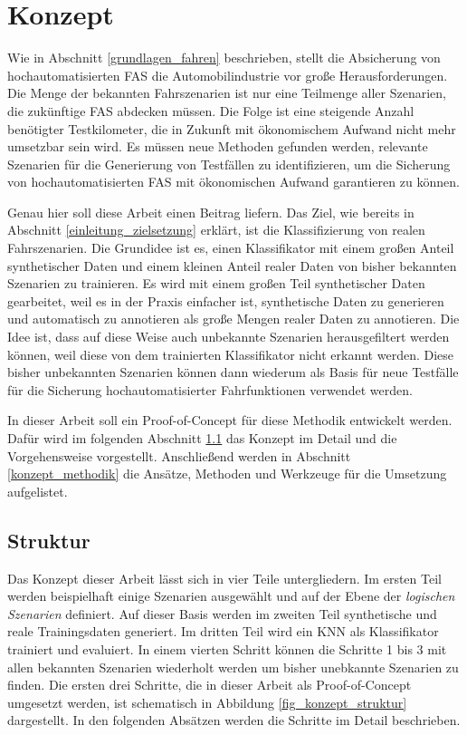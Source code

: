 
\chapter{Konzept}
\label{konzept}

Wie in Abschnitt \ref{grundlagen_fahren} beschrieben, stellt die Absicherung von hochautomatisierten \ac{FAS} die Automobilindustrie vor große Herausforderungen. Die Menge der bekannten Fahrszenarien ist nur eine Teilmenge aller Szenarien, die zukünftige \ac{FAS} abdecken müssen. Die Folge ist eine steigende Anzahl benötigter Testkilometer, die in Zukunft mit ökonomischem Aufwand nicht mehr umsetzbar sein wird. Es müssen neue Methoden gefunden werden, relevante Szenarien für die Generierung von Testfällen zu identifizieren, um die Sicherung von hochautomatisierten \ac{FAS} mit ökonomischen Aufwand garantieren zu können.

Genau hier soll diese Arbeit einen Beitrag liefern. Das Ziel, wie bereits in Abschnitt \ref{einleitung_zielsetzung} erklärt, ist die Klassifizierung von realen Fahrszenarien. Die Grundidee ist es, einen Klassifikator mit einem großen Anteil synthetischer Daten und einem kleinen Anteil realer Daten von bisher bekannten Szenarien zu trainieren. Es wird mit einem großen Teil synthetischer Daten gearbeitet, weil es in der Praxis einfacher ist, synthetische Daten zu generieren und automatisch zu annotieren als große Mengen realer Daten zu annotieren. Die Idee ist, dass auf diese Weise auch unbekannte Szenarien herausgefiltert werden können, weil diese von dem trainierten Klassifikator nicht erkannt werden. Diese bisher unbekannten Szenarien können dann wiederum als Basis für neue Testfälle für die Sicherung hochautomatisierter Fahrfunktionen verwendet werden.

In dieser Arbeit soll ein Proof-of-Concept für diese Methodik entwickelt werden. Dafür wird im folgenden Abschnitt \ref{konzept_struktur} das Konzept im Detail und die Vorgehensweise vorgestellt. Anschließend werden in Abschnitt \ref{konzept_methodik} die Ansätze, Methoden und Werkzeuge für die Umsetzung aufgelistet.


\section{Struktur}
\label{konzept_struktur}

Das Konzept dieser Arbeit lässt sich in vier Teile untergliedern. Im ersten Teil werden beispielhaft einige Szenarien ausgewählt und auf der Ebene der \textit{logischen Szenarien} definiert. Auf dieser Basis werden im zweiten Teil synthetische und reale Trainingsdaten generiert. Im dritten Teil wird ein \ac{KNN} als Klassifikator trainiert und evaluiert. In einem vierten Schritt können die Schritte 1 bis 3 mit allen bekannten Szenarien wiederholt werden um bisher unebkannte Szenarien zu finden. Die ersten drei Schritte, die in dieser Arbeit als Proof-of-Concept umgesetzt werden, ist schematisch in Abbildung \ref{fig_konzept_struktur} dargestellt. In den folgenden Absätzen werden die Schritte im Detail beschrieben.

